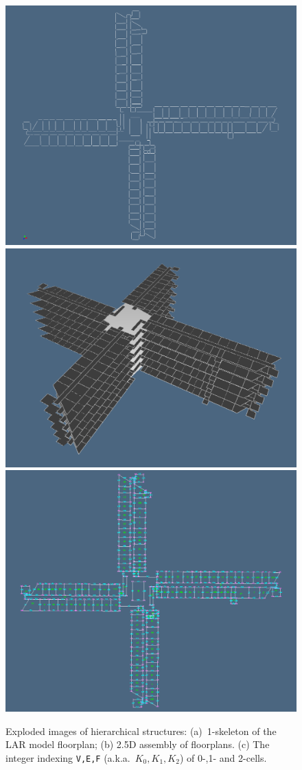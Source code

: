 \documentclass[]{egpubl}
\begin{document}
\begin{figure}[htbp] %
   \centering
   \includegraphics[width=0.469\linewidth]{images/input-png7} 
   \includegraphics[width=0.511\linewidth]{images/input-png12} 
   \includegraphics[width=\linewidth]{images/input-png5} 
   \caption{Exploded images of hierarchical structures: (a)~1-skeleton of the LAR model floorplan; (b) 2.5D assembly of floorplans. (c) The integer indexing \texttt{V,E,F} (a.k.a.~$K_0, K_1, K_2$) of 0-,1- and 2-cells.}
   \label{fig:input-png0}
\end{figure}
\end{document}
